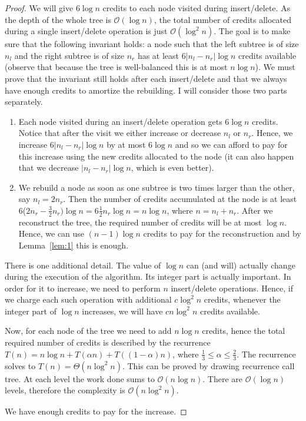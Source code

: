 \documentclass[10pt,a4paper]{article}
\newcommand{\Oh}{\mathcal{O}}
\begin{document}
\begin{proof}

We will give $6\log n$ credits to each node visited during insert/delete. As the depth of the whole tree is $\Oh(\log n)$, the total number of credits allocated during a single insert/delete operation is just $\Oh(\log^{2}n)$. The goal is to make sure that the following invariant holds: a node such that the left subtree is of size $n_{l}$ and the right subtree is of size $n_{r}$ has at least $6|n_{l}-n_{r}|\log n$ credits available (observe that because the tree is well-balanced this is at most $n\log n$). We must prove that the invariant still holds after each insert/delete and that we always have enough credits to amortize the rebuilding. I will consider those two parts separately.

\begin{enumerate}

\item Each node visited during an insert/delete operation gets $6\log n$ credits. Notice that after the visit we either increase or decrease $n_{l}$ or $n_{r}$. Hence, we increase $6|n_{l}-n_{r}|\log n$ by at most $6\log n$ and so we can afford to pay for this increase using the new credits allocated to the node (it can also happen that we decrease $|n_{l}-n_{r}|\log n$, which is even better).

\item We rebuild a node as soon as one subtree is two times larger than the other, say $n_{l} = 2n_{r}$. Then the number of credits accumulated at the node is at least 6($2n_{r}-\frac{3}{2}n_{r}
)\log n = 6\frac{1}{2}n_{r}\log n = n\log n$, where $n=n_{l}+n_{r}$. After we reconstruct the tree, the required number of credits will be at most $\log n$. Hence, we can use $(n-1)\log n$ credits to pay for the reconstruction and by Lemma~\ref{lem:1} this is enough.

\end{enumerate}

There is one additional detail. The value of $\log n$ can (and will) actually change during the execution of the algorithm. Its integer part is actually important. In order for it to increase, we need to perform $n$ insert/delete operations. Hence, if we charge each such operation with additional $c\log^{2} n$ credits, whenever the integer part of $\log n$ increases, we will have $cn\log^{2} n$ credits available. 

Now, for each node of the tree we need to add $n\log n$ credits, hence the total required number of credits is described by the recurrence $T(n)=n\log n+T(\alpha n)+T((1-\alpha)n)$, where $\frac{1}{3}\leq \alpha \leq \frac{2}{3}$. The recurrence solves to $T(n)=\Theta(n\log^{2}n)$. This can be proved by drawing recurrence call tree. At each level the work done sums to $\Oh(n \log n)$. There are $\Oh(\log n)$ levels, therefore the complexity is $\Oh(n \log^2 n)$.

We have enough credits to pay for the increase.
\end{proof}
\end{document}
